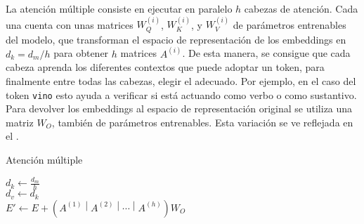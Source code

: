 				La atención múltiple consiste en ejecutar en paralelo $h$ cabezas de atención.  Cada una cuenta con unas matrices $W_Q^{(i)}$, $W_K^{(i)}$, y $W_V^{(i)}$ de parámetros entrenables del modelo, que transforman el espacio de representación de los embeddings en $d_k = d_m / h$ para obtener $h$ matrices $A^{(i)}$. De esta manera, se consigue que cada cabeza aprenda los diferentes contextos que puede adoptar un token, para finalmente entre todas las cabezas, elegir el adecuado. Por ejemplo, en el caso del token \texttt{vino} esto ayuda a verificar si está actuando como verbo o como sustantivo. Para devolver los embeddings al espacio de representación original se utiliza una matriz $W_O$, también de parámetros entrenables. Esta variación se ve reflejada en el . \\
				
				\begin{algorithm}
					\DontPrintSemicolon
					
					\caption{Atención múltiple}
					\label{algo:attention_multiple}
					
					$d_k \gets \frac{d_m}{h}$\\
					$d_v \gets d_k$\\
					$E' \gets E + \left(A^{(1)}\middle|A^{(2)}\middle|\cdots\middle|A^{(h)}\right)W_O$
				\end{algorithm}
				
